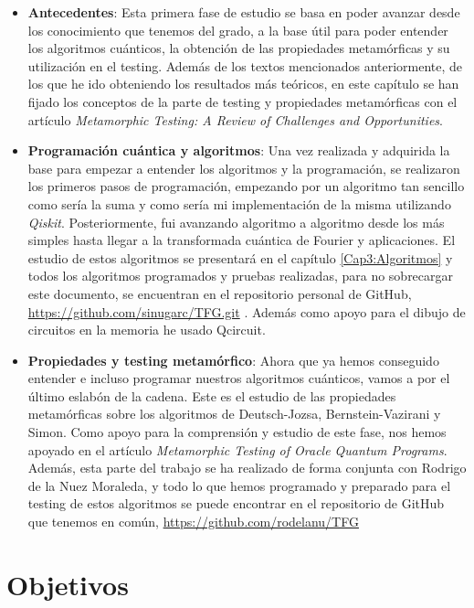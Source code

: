 \begin{itemize}
    \item \textbf{Antecedentes}: Esta primera fase de estudio se basa en poder avanzar desde los conocimiento que tenemos del grado, a la base útil para poder entender los algoritmos cuánticos, la obtención de las propiedades metamórficas y su utilización en el testing. Además de los textos mencionados anteriormente, de los que he ido obteniendo los resultados más teóricos, en este capítulo se han fijado los conceptos de la parte de testing y propiedades metamórficas con el artículo \textit{Metamorphic Testing: A Review of Challenges and Opportunities}\cite{AR:MTmain:2008}.
    
    \item \textbf{Programación cuántica y algoritmos}: Una vez realizada y adquirida la base para empezar a entender los algoritmos y la programación, se realizaron los primeros pasos de programación, empezando por un algoritmo tan sencillo como sería la suma y como sería mi implementación de la misma utilizando \textit{Qiskit}. Posteriormente, fui avanzando algoritmo a algoritmo desde los más simples hasta llegar a la transformada cuántica de Fourier y aplicaciones. El estudio de estos algoritmos se presentará en el capítulo \ref{Cap3:Algoritmos} y todos los algoritmos programados y pruebas realizadas, para no sobrecargar este documento, se encuentran en el repositorio personal de GitHub, \url{https://github.com/sinugarc/TFG.git} . Además como apoyo para el dibujo de circuitos en la memoria he usado Qcircuit. \cite{AR:QcircT:2004}
    
    \item \textbf{Propiedades y testing metamórfico}: Ahora que ya hemos conseguido entender e incluso programar nuestros algoritmos cuánticos, vamos a por el último eslabón de la cadena. Este es el estudio de las propiedades metamórficas sobre los algoritmos de Deutsch-Jozsa, Bernstein-Vazirani y Simon. Como apoyo para la comprensión y estudio de este fase, nos hemos apoyado en el artículo \textit{Metamorphic Testing of Oracle Quantum Programs}\cite{metamorphicAdd:2022}. Además, esta parte del trabajo se ha realizado de forma conjunta con Rodrigo de la Nuez Moraleda, y todo lo que hemos programado y preparado para el testing de estos algoritmos se puede encontrar en el repositorio de GitHub que tenemos en común, \url{https://github.com/rodelanu/TFG}
\end{itemize}

\section{Objetivos}
\label{Sec1.2:Objetivos}

